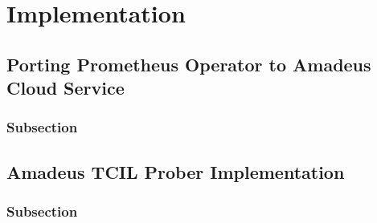 
\chapter{Implementation}\label{chapter:implementation}

\section{Porting Prometheus Operator to Amadeus Cloud Service}

\subsection{Subsection}

\section{Amadeus TCIL Prober Implementation}

\subsection{Subsection}